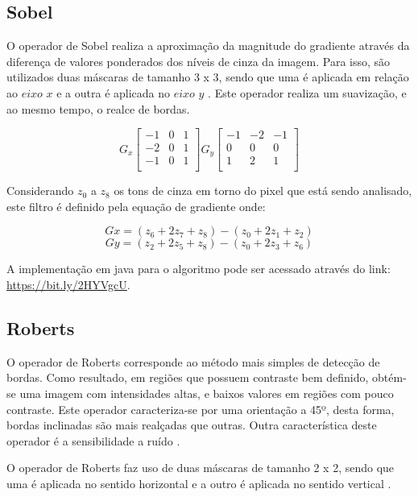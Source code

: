 \documentclass[
	12pt,				%
	oneside,			%
	a4paper,			%
	english,			%
	french,				%
	spanish,			%
	brazil,				%
	]{abntex2}
\begin{document}
\subsection{Sobel}

O operador de Sobel realiza a aproximação da magnitude do gradiente através da diferença de valores ponderados dos níveis de cinza da imagem. Para isso, são utilizados duas máscaras de tamanho 3 x 3, sendo que uma é aplicada em relação ao \(eixo\) \(x\) e a outra é aplicada no \(eixo\) \(y\) \cite{pedriniSchwartz:2008}. Este operador realiza um suavização, e ao mesmo tempo, o realce de bordas.

\[
G_x
\begin{bmatrix}
    -1 & 0 & 1   \\ 
	-2 & 0 & 1   \\ 
	-1 & 0 & 1   \\ 
\end{bmatrix} 
G_y
\begin{bmatrix}
    -1 & -2 & -1   \\ 
	 0 &  0 & 0    \\ 
	 1 &  2 & 1    \\    
\end{bmatrix} 
\]

Considerando \(z_0\) a \(z_8\) os tons de cinza em torno do pixel que está sendo analisado, este filtro é definido pela equação de gradiente onde:

\[Gx = (z_6 + 2z_7 + z_8) - (z_0 + 2z_1 + z_2)\]
\[Gy = (z_2 + 2z_5 + z_8) - (z_0 + 2z_3 + z_6)\]

A implementação em java para o algoritmo pode ser acessado através do link: \url{https://bit.ly/2HYVgcU}.

\subsection{Roberts}
O operador de Roberts corresponde ao método mais simples de detecção de bordas. Como resultado, em regiões que possuem contraste bem definido, obtém-se uma imagem com intensidades altas, e baixos valores em regiões com pouco contraste. Este operador caracteriza-se por uma orientação a 45º, desta forma, bordas inclinadas são mais realçadas que outras. Outra característica deste operador é a sensibilidade a ruído \cite{conciAzevedoLeta:2008}.

O operador de Roberts faz uso de duas máscaras de tamanho 2 x 2, sendo que uma é aplicada no sentido horizontal e a outro é aplicada no sentido vertical \cite{pedriniSchwartz:2008}.
\end{document}
